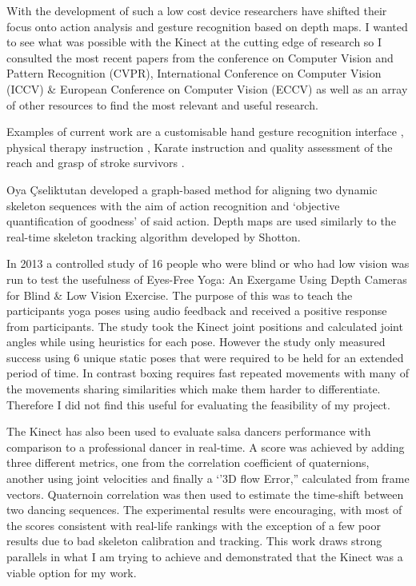 With the development of such a low cost device researchers have shifted their focus onto action analysis and gesture recognition based on depth maps. I wanted to see what was possible with the Kinect at the cutting edge of research so I consulted the most recent papers from the conference on Computer Vision and Pattern Recognition (CVPR), International Conference on Computer Vision (ICCV) \& European Conference on Computer Vision (ECCV) as well as an array of other resources to find the most relevant and useful research. 

Examples of current work are a customisable hand gesture recognition interface \cite{chr}, physical therapy instruction \cite{physio}\cite{Kinect2012}, Karate instruction \cite{karate} and quality assessment of the reach and grasp of stroke survivors \cite{rehab}.

Oya \c{C}seliktutan developed a graph-based method for aligning two dynamic skeleton sequences with the aim of action recognition and `objective quantification of goodness' of said action. \cite{Celiktutan2013a} Depth maps are used similarly to the real-time skeleton tracking algorithm developed by Shotton. \cite{Shotton2011}


In 2013 a controlled study of 16 people who were blind or who had low vision was run to test the usefulness of Eyes-Free Yoga: An Exergame Using Depth Cameras for Blind \& Low Vision Exercise. The purpose of this was to teach the participants yoga poses using audio feedback and received a positive response from participants.\cite{Rector2013} The study took the Kinect joint positions and calculated joint angles while using heuristics for each pose. However the study only measured success using 6 unique static poses that were required to be held for an extended period of time. In contrast boxing requires fast repeated movements with many of the movements sharing similarities which make them harder to differentiate. Therefore I did not find this useful for evaluating the feasibility of my project.

The Kinect has also been used to evaluate salsa dancers performance with comparison to a professional dancer in real-time\cite{Alexiadis2011}\cite{vdpe}. A score was achieved by adding three different metrics, one from the correlation coefficient of quaternions, another using joint velocities and finally a `'3D flow Error,'' calculated from frame vectors. Quaternoin correlation was then used to estimate the time-shift between two dancing sequences.\newline
The experimental results were encouraging, with most of the scores consistent with real-life rankings with the exception of a few poor results due to bad skeleton calibration and tracking. This work draws strong parallels in what I am trying to achieve and demonstrated that the Kinect was a viable option for my work.

